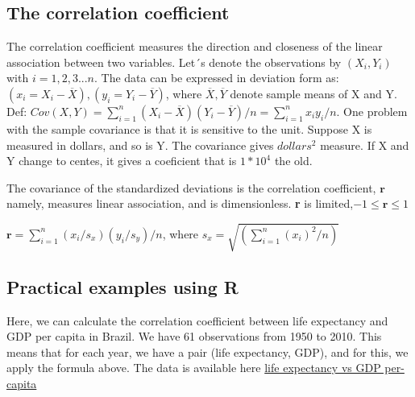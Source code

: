 \documentclass{article} %
\begin{document}
\subsection{The correlation coefficient}
 The correlation coefficient measures the direction and closeness of the linear association between two variables.
Let´s denote the observations by \begin{math}(X_i, Y_i)\end{math} with \begin{math}i=1,2,3...n\end{math}. The data can be expressed in deviation form as: \begin{math}(x_i= X_i-\overline{X}), (y_i=Y_i-\overline{Y})\end{math}, where \begin{math}\overline{X}, \overline{Y}\end{math} denote sample means of X and Y.
Def: \begin{math} Cov(X,Y)=\sum_{i=1}^{n} (X_i - \overline{X})(Y_i-\overline{Y})/n = \sum_{i=1}^{n}x_iy_i/n
\end{math}.
One problem with the sample covariance is that it is sensitive to the unit. Suppose X is measured in dollars, and so is Y. The covariance gives \begin{math}dollars^2\end{math} measure. If X and Y change to centes, it gives a coeficient that is \begin{math} 1*10^{4}\end{math} the old.

The covariance of the standardized deviations is the correlation coefficient, $\textbf{r}$ namely, measures linear association, and is dimensionless. \textbf{r} is limited,\begin{math}
   -1 \leq\mathbf{r}\leq1\end{math}


\begin{math} \textbf{r} = \sum_{i=1}^{n} (x_i/s_x)(y_i/s_y)/n\end{math}, where \begin{math} s_x=\sqrt{(\sum_{i=1}^{n} (x_i)^2/n)}\end{math}


\subsection{Practical examples using R}
Here, we can calculate the correlation coefficient between life expectancy and GDP per capita in Brazil. We have 61 observations from 1950 to 2010. This means that for each year, we have a pair (life expectancy, GDP), and for this, we apply the formula above.
The data is available here \href{https://ourworldindata.org/grapher/life-expectancy-vs-gdp-per-capita}{life expectancy vs GDP per-capita}
\end{document}
